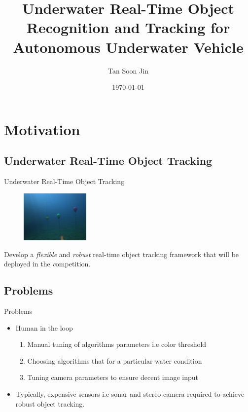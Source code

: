 \documentclass{beamer}
\title{Underwater Real-Time Object Recognition and Tracking for
Autonomous Underwater Vehicle}
\author{Tan Soon Jin}
\institute[National University of Singapore]{Department of Computer Science}
\date{\today}
\begin{document}
\frame{\titlepage}

\section{Motivation}

\subsection{Underwater Real-Time Object Tracking}
\begin{frame}{Underwater Real-Time Object Tracking}
    \begin{figure}[ht]
        \centering
        \includegraphics[width=0.3\textwidth, height=0.3\textwidth]{figs/robosub16_buoy_bluish.png}
    \end{figure}
    Develop a \textit{flexible} and \textit{robust} real-time object tracking framework that will be deployed in the \textit competition.
\end{frame}

\subsection{Problems}
\begin{frame}{Problems}
    \begin{itemize}
        \item Human in the loop
            \begin{enumerate}
                \item Manual tuning of algorithms parameters i.e color threshold
                \item Choosing algorithms that for a particular water condition
                \item Tuning camera parameters to ensure decent image input
            \end{enumerate}
        \item Typically, expensive sensors i.e sonar and stereo camera required to achieve robust object tracking.
    \end{itemize}
\end{frame}
\end{document}
